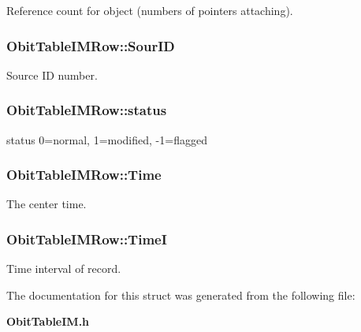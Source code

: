 Reference count for object (numbers of pointers attaching). 

\subsubsection{ {\bf Obit\-Table\-IMRow::Sour\-ID}}\label{structObitTableIMRow_o8}


Source ID number. 

\subsubsection{ {\bf Obit\-Table\-IMRow::status}}\label{structObitTableIMRow_o26}


status 0=normal, 1=modified, -1=flagged 

\subsubsection{ {\bf Obit\-Table\-IMRow::Time}}\label{structObitTableIMRow_o6}


The center time. 

\subsubsection{ {\bf Obit\-Table\-IMRow::Time\-I}}\label{structObitTableIMRow_o7}


Time interval of record. 



The documentation for this struct was generated from the following file:\begin{CompactItemize}
\item 
{\bf Obit\-Table\-IM.h}\end{CompactItemize}
